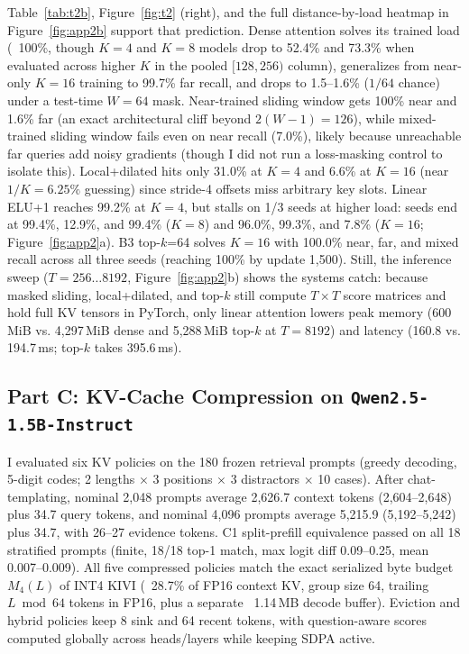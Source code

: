\documentclass{article}
\begin{document}
Table~\ref{tab:t2b}, Figure~\ref{fig:t2} (right), and the full distance-by-load heatmap in Figure~\ref{fig:app2b} support that prediction. Dense attention solves its trained load (~100\%, though $K=4$ and $K=8$ models drop to 52.4\% and 73.3\% when evaluated across higher $K$ in the pooled $[128,256)$ column), generalizes from near-only $K=16$ training to 99.7\% far recall, and drops to 1.5--1.6\% ($1/64$ chance) under a test-time $W=64$ mask. Near-trained sliding window gets 100\% near and 1.6\% far (an exact architectural cliff beyond $2(W-1)=126$), while mixed-trained sliding window fails even on near recall (7.0\%), likely because unreachable far queries add noisy gradients (though I did not run a loss-masking control to isolate this). Local+dilated hits only 31.0\% at $K=4$ and 6.6\% at $K=16$ (near $1/K=6.25\%$ guessing) since stride-4 offsets miss arbitrary key slots. Linear ELU+1 reaches 99.2\% at $K=4$, but stalls on 1/3 seeds at higher load: seeds end at 99.4\%, 12.9\%, and 99.4\% ($K=8$) and 96.0\%, 99.3\%, and 7.8\% ($K=16$; Figure~\ref{fig:app2}a). B3 top-$k$=64 solves $K=16$ with 100.0\% near, far, and mixed recall across all three seeds (reaching 100\% by update 1,500). Still, the inference sweep ($T=256\dots 8192$, Figure~\ref{fig:app2}b) shows the systems catch: because masked sliding, local+dilated, and top-$k$ still compute $T{\times}T$ score matrices and hold full KV tensors in PyTorch, only linear attention lowers peak memory (600\,MiB vs. 4,297\,MiB dense and 5,288\,MiB top-$k$ at $T=8192$) and latency (160.8 vs. 194.7\,ms; top-$k$ takes 395.6\,ms).

\subsection{Part C: KV-Cache Compression on \texttt{Qwen2.5-1.5B-Instruct}}
I evaluated six KV policies on the 180 frozen retrieval prompts (greedy decoding, 5-digit codes; 2 lengths $\times$ 3 positions $\times$ 3 distractors $\times$ 10 cases). After chat-templating, nominal 2,048 prompts average 2,626.7 context tokens (2,604--2,648) plus 34.7 query tokens, and nominal 4,096 prompts average 5,215.9 (5,192--5,242) plus 34.7, with 26--27 evidence tokens. C1 split-prefill equivalence passed on all 18 stratified prompts (finite, 18/18 top-1 match, max logit diff 0.09--0.25, mean 0.007--0.009). All five compressed policies match the exact serialized byte budget $M_4(L)$ of INT4 KIVI (~28.7\% of FP16 context KV, group size 64, trailing $L \bmod 64$ tokens in FP16, plus a separate ~1.14\,MB decode buffer). Eviction and hybrid policies keep 8 sink and 64 recent tokens, with question-aware scores computed globally across heads/layers while keeping SDPA active.
\end{document}
